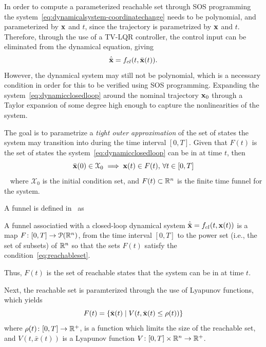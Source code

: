 In order to compute a parameterized reachable set through \ac{SOS} programming
the system~\cref{eq:dynamicalsystem-coordinatechange} needs to be polynomial,
and parameterized by \(\mathbf{x}\) and \(t\), since the trajectory is
parametrized by \(\mathbf{x}\) and \(t\). Therefore, through the use of a
\ac{TV-LQR} controller, the control input can be eliminated from the dynamical
equation, giving
\begin{equation}
  \label{eq:dynamicclosedloop}
  \dot{\bar{\mathbf{x}}} = f_{cl}(t,\bar{\mathbf{x}}(t)).
\end{equation}
However, the dynamical system may still not be polynomial, which is a necessary
condition in order for this to be verified using \ac{SOS} programming. Expanding
the system~\cref{eq:dynamicclosedloop} around the nominal trajectory
\(\mathbf{x}_0\) through a Taylor expansion of some degree high enough to capture
the nonlinearities of the system.

The goal is to parametrize a \textit{tight outer approximation} of the set of
states the system may transition into during the time interval \([0,T]\). Given
that \(F(t)\) is the set of states the system~\cref{eq:dynamicclosedloop} can be
in at time \(t\), then
\begin{equation}
  \label{eq:reachableset}
  \bar{\mathbf{x}}(0) \in \mathcal{X}_0 \implies \mathbf{x}(t) \in F(t), \, \forall t \in [0,T]
\end{equation}~\cite{majumdarFunnelLibrariesRealtime2017} 
where \(\mathcal{X}_0\) is the initial condition set, and \(F(t) \subset \mathbb{R}^n\)
is the finite time funnel for the system.

A funnel is defined in~\cite[Majumdar]{majumdarFunnelLibrariesRealtime2017} as
\begin{definition}
  \label{def:funnel}
  A funnel associatied with a closed-loop dynamical system
  \(\dot{\bar{\mathbf{x}}} = f_{cl}(t,\mathbf{x}(t))\) is a map \(F \colon [0,T]
  \rightarrow \mathcal{P}(\mathbb{R}^n)\), from the time interval \([0,T]\) to the power
  set (i.e., the set of subsets) of \(\mathbb{R}^n\) so that the sets \(F(t)\) satisfy
  the condition~\cref{eq:reachableset}.
\end{definition}
Thus, \(F(t)\) is the set of reachable states that the system can be in at time
\(t\).

Next, the reachable set is paramterized through the use of Lyapunov functions,
which yields
\begin{equation}
  F(t) = \lbrace\bar{\mathbf{x}}(t) \mid V(t, \bar{\mathbf{x}}(t) \leq \rho (t))\rbrace
\end{equation}
where \(\rho (t) \colon [0,T] \rightarrow \mathbb{R}^+\), is a function which limits the
size of the reachable set, and \(V(t,\bar{x}(t))\) is a Lyapunov function \(V
\colon [0,T] \times \mathbb{R}^n \rightarrow \mathbb{R}^+\).

